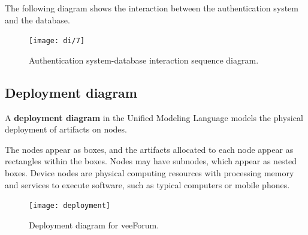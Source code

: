\documentclass[12pt]{report}
\renewcommand\emph{\textbf}
\begin{document}
                \newpage

                The following diagram shows the interaction between the authentication system and the database.

                \begin{figure}[H]
                \caption{Authentication system-database interaction sequence diagram.}
                \centering
                \texttt{[image: di/7]}
                \end{figure}

                \newpage

                \newpage

            \subsection{Deployment diagram}

                A \emph{deployment diagram} in the Unified Modeling Language models the physical deployment of artifacts on nodes.

                The nodes appear as boxes, and the artifacts allocated to each node appear as rectangles within the boxes. Nodes may have subnodes, which appear as nested boxes. Device nodes are physical computing resources with processing memory and services to execute software, such as typical computers or mobile phones. 

                \begin{figure}[H]
                \caption{Deployment diagram for veeForum.}
                \centering
                \texttt{[image: deployment]}
                \end{figure}
\end{document}
